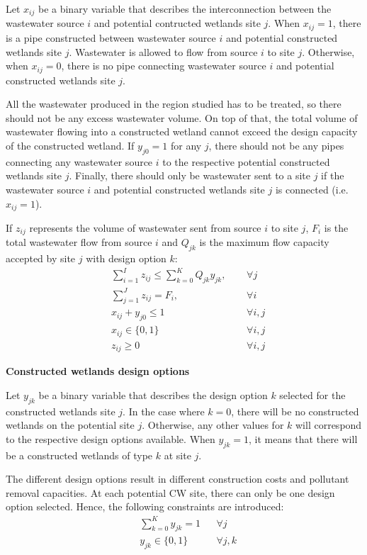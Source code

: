 \documentclass[preprint,12pt,authoryear]{elsarticle}
\begin{document}
Let $x_{ij}$ be a binary variable that describes the interconnection between the wastewater source $i$ and potential contructed wetlands site $j$. When $x_{ij} = 1$, there is a pipe constructed between wastewater source $i$ and potential constructed wetlands site $j$. Wastewater is allowed to flow from source $i$ to site $j$. Otherwise, when $x_{ij} = 0$, there is no pipe connecting wastewater source $i$ and potential constructed wetlands site $j$. 

All the wastewater produced in the region studied has to be treated, so there should not be any excess wastewater volume. On top of that, the total volume of wastewater flowing into a constructed wetland cannot exceed the design capacity of the constructed wetland. If $y_{j0} = 1$ for any $j$, there should not be any pipes connecting any wastewater source $i$ to the respective potential constructed wetlands site $j$. Finally, there should only be wastewater sent to a site $j$ if the wastewater source $i$ and potential constructed wetlands site $j$ is connected (i.e. $x_{ij} = 1$). 

If $z_{ij}$ represents the volume of wastewater sent from source $i$ to site $j$, $F_{i}$ is the total wastewater flow from source $i$ and $Q_{jk}$ is the maximum flow capacity accepted by site $j$ with design option $k$:
\begin{align}
	&\sum_{i=1}^{I}z_{ij}\leq \sum_{k=0}^{K}Q_{jk}y_{jk},~~ &&\forall j\\
	&\sum_{j=1}^J z_{ij} = F_i,&&\forall i\\
	&x_{ij} + y_{j0} \leq 1 && \forall i,j \\
	&x_{ij}\in\{0,1\}&&\forall i,j\\
	&z_{ij} \geq 0 && \forall i,j %
\end{align}

\noindent\textbf{Constructed wetlands design options} 

Let $y_{jk}$ be a binary variable that describes the design option $k$ selected for the constructed wetlands site $j$. In the case where $k=0$, there will be no constructed wetlands on the potential site $j$. Otherwise, any other values for $k$ will correspond to the respective design options available. When $y_{jk} = 1$, it means that there will be a constructed wetlands of type $k$ at site $j$. 

The different design options result in different construction costs and pollutant removal capacities. At each potential CW site, there can only be one design option selected. Hence, the following constraints are introduced:
\begin{align}
	&\sum_{k=0}^{K}y_{jk}=1&&\forall j\\
	&y_{jk}\in\{0,1\}&&\forall j,k
\end{align}
 
\end{document}
